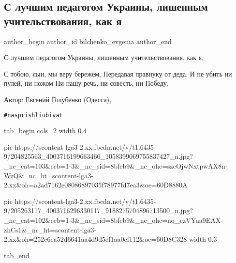  
 
 
 
 
 
\subsection{С лучшим педагогом Украины, лишенным учительствования, как я}
\label{sec:23_06_2021.fb.bilchenko_evgenia.7.s_luschim_pedagogom_ukrainy}
\ifcmt
 author_begin
   author_id bilchenko_evgenia
 author_end
\fi

\noindent
С лучшим педагогом Украины, лишенным учительствования, как я.

\obeycr
\noindent С тобою, сын, мы веру бережём,
Передавая правнуку от деда.
И не убить ни пулей, ни ножом
Ни нашу речь, ни совесть, ни Победу.
\restorecr

Автор: Евгений Голубенко (Одесса), 

\verb|#nasprishliubivat|


\ifcmt
  tab_begin cols=2
		 width 0.4

     pic https://scontent-lga3-2.xx.fbcdn.net/v/t1.6435-9/204825563_4003716199663460_1058399069755837427_n.jpg?_nc_cat=103&ccb=1-3&_nc_sid=8bfeb9&_nc_ohc=szcOjwNxtpwAX8n-WzQ&_nc_ht=scontent-lga3-2.xx&oh=a2ad7162e08086897035f78977fd7ea3&oe=60D8880A

     pic https://scontent-lga3-2.xx.fbcdn.net/v/t1.6435-9/205263117_4003716296330117_9188275704896713500_n.jpg?_nc_cat=102&ccb=1-3&_nc_sid=8bfeb9&_nc_ohc=nq_czVYua9EAX-zhCs1&_nc_ht=scontent-lga3-2.xx&oh=252c6ea52d6641aa4d9d5ef1aa0cf112&oe=60D8C328
		 width 0.3

  tab_end
\fi


